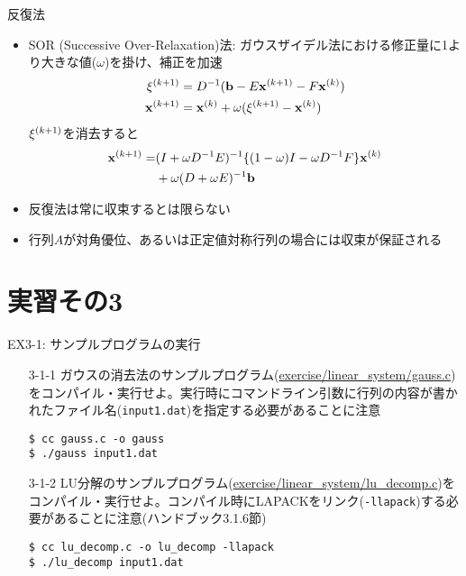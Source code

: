 \documentclass[dvipdfmx]{beamer}
\begin{document}
\begin{frame}[t,fragile]{反復法}
  \begin{itemize}
    \setlength{\itemsep}{1em}
  \item SOR (Successive Over-Relaxation)法: ガウスザイデル法における修正量に1より大きな値($\omega$)を掛け、補正を加速
    \begin{align*}
      {\bf \xi}^{(k+1)} &= D^{-1} ({\bf b} - E{\bf x}^{(k+1)} - F{\bf x}^{(k)}) \\
      {\bf x}^{(k+1)} &= {\bf x}^{(k)} + \omega({\bf \xi}^{(k+1)} - {\bf x}^{(k)})
    \end{align*}
    ${\bf \xi}^{(k+1)}$を消去すると
    \begin{align*}
      {\bf x}^{(k+1)} = &(I+\omega D^{-1}E)^{-1} \{(1-\omega)I - \omega D^{-1} F\}{\bf x}^{(k)} \\ &+ \omega(D+\omega E)^{-1}{\bf b}
    \end{align*}
    \item 反復法は常に収束するとは限らない
    \item 行列$A$が対角優位、あるいは正定値対称行列の場合には収束が保証される
  \end{itemize}
\end{frame}

\section{実習その3}

\begin{frame}[t,fragile]{EX3-1: サンプルプログラムの実行}
  \begin{itemize}
  \item[3-1-1] ガウスの消去法のサンプルプログラム(\href{https://github.com/todo-group/computer-experiments/exercise/linear_system/gauss.c}{exercise/linear\_system/gauss.c})をコンパイル・実行せよ。実行時にコマンドライン引数に行列の内容が書かれたファイル名({\tt input1.dat})を指定する必要があることに注意
\begin{lstlisting}
$ cc gauss.c -o gauss
$ ./gauss input1.dat
\end{lstlisting}
  \item[3-1-2] LU分解のサンプルプログラム(\href{https://github.com/todo-group/computer-experiments/exercise/linear_system/lu_decomp.c}{exercise/linear\_system/lu\_decomp.c})をコンパイル・実行せよ。コンパイル時にLAPACKをリンク({\tt -llapack})する必要があることに注意(ハンドブック3.1.6節)
\begin{lstlisting}
$ cc lu_decomp.c -o lu_decomp -llapack
$ ./lu_decomp input1.dat
\end{lstlisting}
  \end{itemize}
\end{frame}
\end{document}
